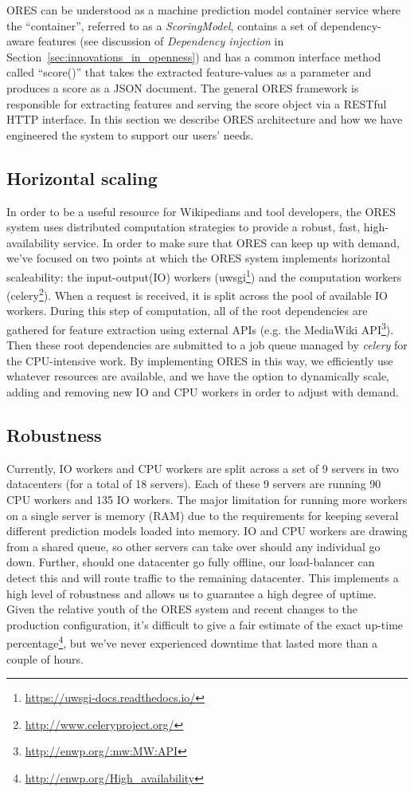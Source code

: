 
ORES can be understood as a machine prediction model container service where the ``container'', referred to as a \emph{ScoringModel}, contains a set of dependency-aware features (see discussion of \emph{Dependency injection} in Section~\ref{sec:innovations_in_openness}) and has a common interface method called ``score()'' that takes the extracted feature-values as a parameter and produces a score as a JSON document.  The general ORES framework is responsible for extracting features and serving the score object via a RESTful HTTP interface.  In this section we describe ORES architecture and how we have engineered the system to support our users' needs.

\subsection{Horizontal scaling}
In order to be a useful resource for Wikipedians and tool developers, the ORES system uses distributed computation strategies to provide a robust, fast, high-availability service.   In order to make sure that ORES can keep up with demand, we've focused on two points at which the ORES system implements horizontal scaleability: the input-output(IO) workers (uwsgi\footnote{\url{https://uwsgi-docs.readthedocs.io/}}) and the computation workers (celery\footnote{\url{http://www.celeryproject.org/}}).  When a request is received, it is split across the pool of available IO workers.  During this step of computation, all of the root dependencies are gathered for feature extraction using external APIs (e.g. the MediaWiki API\footnote{\url{http://enwp.org/:mw:MW:API}}).  Then these root dependencies are submitted to a job queue managed by \emph{celery} for the CPU-intensive work.  By implementing ORES in this way, we efficiently use whatever resources are available, and we have the option to dynamically scale, adding and removing new IO and CPU workers in order to adjust with demand.

\subsection{Robustness}
Currently, IO workers and CPU workers are split across a set of 9 servers in two datacenters (for a total of 18 servers).  Each of these 9 servers are running 90 CPU workers and 135 IO workers.  The major limitation for running more workers on a single server is memory (RAM) due to the requirements for keeping several different prediction models loaded into memory.  IO and CPU workers are drawing from a shared queue, so other servers can take over should any individual go down.  Further, should one datacenter go fully offline, our load-balancer can detect this and will route traffic to the remaining datacenter.  This implements a high level of robustness and allows us to guarantee a high degree of uptime.  Given the relative youth of the ORES system and recent changes to the production configuration, it's difficult to give a fair estimate of the exact up-time percentage\footnote{\url{http://enwp.org/High_availability}}, but we've never experienced downtime that lasted more than a couple of hours.

